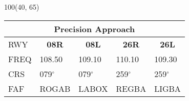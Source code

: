 \documentclass[10pt,landscape,a4paper]{article}
\begin{document}
\begin{textblock}{100}(40, 65)
\begin{table}[]
\begin{tabular}{lllll}
\multicolumn{5}{c}{\textbf{Precision Approach}} \\ \hline
\multicolumn{1}{|l|}{RWY} & \multicolumn{1}{c|}{\textbf{08R}} & \multicolumn{1}{c|}{\textbf{08L}} & \multicolumn{1}{c|}{\textbf{26R}} & \multicolumn{1}{c|}{\textbf{26L}} \\ \hline
\multicolumn{1}{|l|}{FREQ} & \multicolumn{1}{l|}{108.50} & \multicolumn{1}{l|}{109.10} & \multicolumn{1}{l|}{110.10} & \multicolumn{1}{l|}{109.30} \\
\multicolumn{1}{|l|}{CRS} & \multicolumn{1}{l|}{079$^\circ$} & \multicolumn{1}{l|}{079$^\circ$} & \multicolumn{1}{l|}{259$^\circ$} & \multicolumn{1}{l|}{259$^\circ$} \\
\multicolumn{1}{|l|}{FAF} & \multicolumn{1}{l|}{ROGAB} & \multicolumn{1}{l|}{LABOX} & \multicolumn{1}{l|}{REGBA} & \multicolumn{1}{l|}{LIGBA} \\ \hline
\end{tabular}
\end{table}
\end{textblock}
\end{document}
